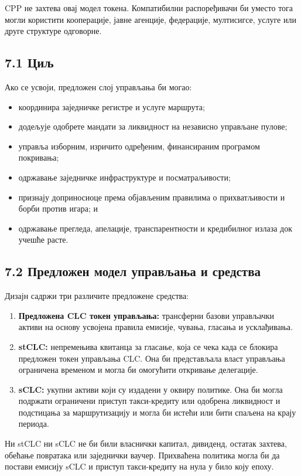 \documentclass[11pt]{article}
\begin{document}
CPP не захтева овај модел токена. Компатибилни распоређивачи би уместо тога могли користити кооперације, јавне агенције, федерације, мултисигсе, услуге или друге структуре одговорне.

\subsection*{7.1 Циљ}

Ако се усвоји, предложен слој управљања би могао:

\begin{itemize}[leftmargin=*]
\item координира заједничке регистре и услуге маршрута;
\item додељује одобрете мандати за ликвидност на независно управљане пулове;
\item управља изборним, изричито одређеним, финансираним програмом покривања;
\item одржавање заједничке инфраструктуре и посматраљивости;
\item признају доприносиоце према објављеним правилима о прихватљивости и борби против игара; и
\item одржавање прегледа, апелације, транспарентности и кредибилног излаза док учешће расте.
\end{itemize}
\subsection*{7.2 Предложен модел управљања и средства}

Дизајн садржи три различите предложене средства:

\begin{enumerate}[leftmargin=*]
\item \textbf{Предложена CLC токен управљања:} трансферни базови управљачки активи на основу усвојена правила емисије, чувања, гласања и усклађивања.
\item \textbf{stCLC:} непремењива квитанца за гласање, која се чека када се блокира предложен токен управљања CLC. Она би представљала власт управљања ограничена временом и могла би омогућити откривање делегације.
\item \textbf{sCLC:} укупни активи који су издадени у оквиру политике. Она би могла подржати ограничени приступ такси-кредиту или одобрена ликвидност и подстицања за маршрутизацију и могла би истећи или бити спаљена на крају периода.
\end{enumerate}
Ни stCLC ни sCLC не би били власнички капитал, дивиденд, остатак захтева, обећање повратака или заједнички ваучер. Прихваћена политика могла би да постави емисију sCLC и приступ такси-кредиту на нула у било коју епоху.
\end{document}

